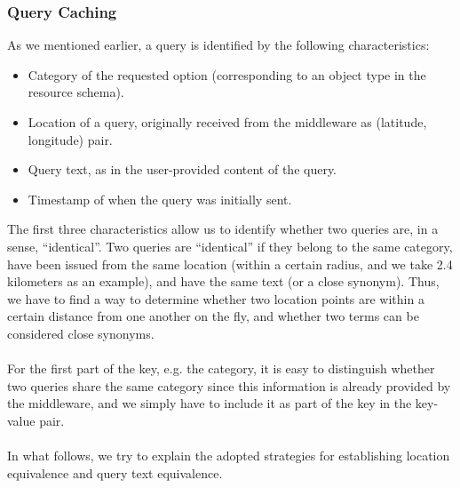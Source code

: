 \subsubsection{Query Caching}
As we mentioned earlier, a query is identified by the following characteristics:
\begin{itemize}
  \item Category of the requested option (corresponding to an object type in the resource schema).
  \item Location of a query, originally received from the middleware as (latitude, longitude) pair.
  \item Query text, as in the user-provided content of the query.
  \item Timestamp of when the query was initially sent.
\end{itemize}
The first three characteristics allow us to identify whether two queries are, in a sense, ``identical''. Two queries are ``identical'' if they belong to the same category, have been issued from the same location (within a certain radius, and we take 2.4 kilometers as an example), and have the same text (or a close synonym). Thus, we have to find a way to determine whether two location points are within a certain distance from one another on the fly, and whether two terms can be considered close synonyms.\\\\
For the first part of the key, e.g. the category, it is easy to distinguish whether two queries share the same category since this information is already provided by the middleware, and we simply have to include it as part of the key in the key-value pair.\\\\
In what follows, we try to explain the adopted strategies for establishing location equivalence and query text equivalence.
